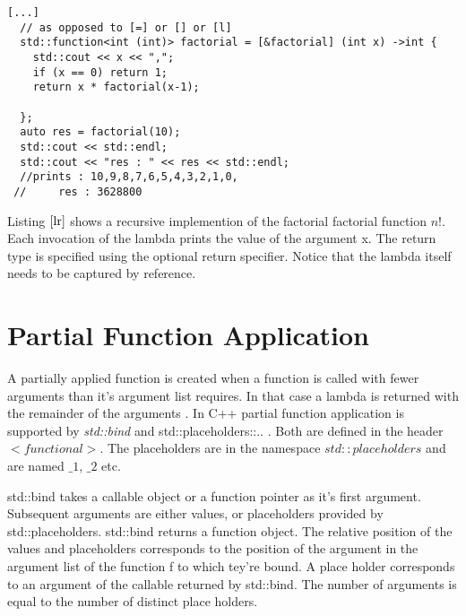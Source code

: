 \documentclass[12pt,fleqn]{article}
\begin{document}
\begin{lstlisting}[caption=implementation of factorial using lambda recursion, label=lr]
[...]
  // as opposed to [=] or [] or [l]
  std::function<int (int)> factorial = [&factorial] (int x) ->int {
    std::cout << x << ",";
    if (x == 0) return 1;
    return x * factorial(x-1);
    
  };
  auto res = factorial(10);
  std::cout << std::endl;
  std::cout << "res : " << res << std::endl;
  //prints : 10,9,8,7,6,5,4,3,2,1,0,
 //     res : 3628800
\end{lstlisting}

Listing $\ref{lr}$ shows a recursive implemention of the factorial factorial function $n!$. 
Each invocation of the lambda prints the value of the argument x.
The return type is specified using the optional return specifier.
Notice that the lambda itself needs to be captured by reference.
 
\section*{Partial Function Application}
A partially applied function is created when a function is called with fewer arguments than it's argument list requires.
In that case a lambda is returned with the remainder of the arguments \cite{field}.
In C++ partial function application is supported by {\em std::bind} \cite{std::bind} and {std::placeholders::..} \cite{std::placeholder}.
Both are defined in the header $<functional>$. The placeholders are in the namespace $std::placeholders$ and are named $\_1$, $\_2$ etc.

std::bind takes a callable object or a function pointer as it's first argument.
Subsequent arguments are either values, or placeholders provided by std::placeholders. 
std::bind returns a function object.
The relative position of the values and placeholders corresponds to the position of the argument in the argument list of the function f to which tey're bound. 
A place holder corresponds to an argument of the callable returned by std::bind.
The number of arguments is equal to the number of distinct place holders.
\end{document}
